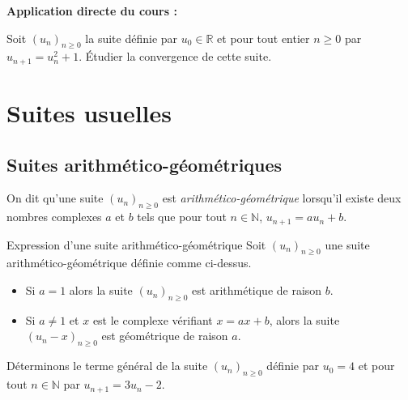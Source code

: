 \documentclass[french,11pt,twoside]{VcCours}
\newenvironment{ApplicationDirecte}{\textbf{Application directe du cours :}

}{}
\begin{document}

\newpage

\vspace*{10cm}

\begin{ApplicationDirecte}
Soit $(u_n)_{n \geq 0}$ la suite définie par $u_0 \in \mathbb{R}$ et pour tout entier $n \geq 0$ par $u_{n+1}=u_n^2+1$. Étudier la convergence de cette suite.
\end{ApplicationDirecte}


\section{Suites usuelles}
\subsection{Suites arithmético-géométriques}

\begin{Definition}{}
On dit qu'une suite $(u_n)_{n \geq 0}$ est \emph{arithmético-géométrique} lorsqu'il existe deux nombres complexes $a$ et $b$ tels que pour tout $n \in \mathbb{N}$, $u_{n+1} = a u_n + b$.
\end{Definition}

\begin{Theoreme}{Expression d'une suite arithmético-géométrique}
Soit $(u_n)_{n \geq 0}$ une suite arithmético-géométrique définie comme ci-dessus.
\begin{itemize}
\item Si $a=1$ alors la suite $(u_n)_{n \geq 0}$ est arithmétique de raison $b$.
\item Si $a \neq 1$ et $x$ est le complexe vérifiant $x=ax+b$, alors la suite $(u_n-x)_{n \geq 0}$ est géométrique de raison $a$.
\end{itemize}
\end{Theoreme}

\begin{Exemple} Déterminons le terme général de la suite $(u_n)_{n \geq 0}$ définie par $u_0=4$ et pour tout $n \in \mathbb{N}$ par $u_{n+1}=3u_n-2$.

\newpage
%

\vspace{4cm}
\end{Exemple}
\end{document}
